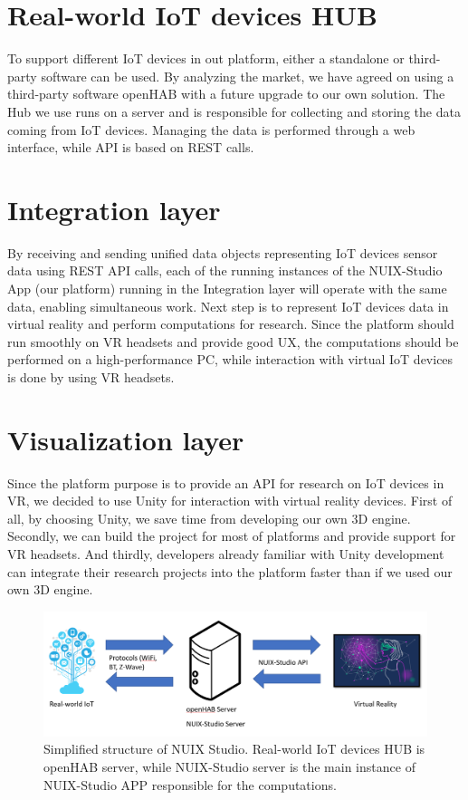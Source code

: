 \section{Real-world IoT devices HUB}
To support different IoT devices in out platform, either a standalone or third-party software can be used. By analyzing the market, we have agreed on using a third-party software openHAB with a future upgrade to our own solution. The Hub we use runs on a server and is responsible for collecting and storing the data coming from IoT devices. Managing the data is performed through a web interface, while API is based on REST calls.

\section{Integration layer}
By receiving and sending unified data objects representing IoT devices sensor data using REST API calls, each of the running instances of the NUIX-Studio App (our platform) running in the Integration layer will operate with the same data, enabling simultaneous work.
Next step is to represent IoT devices data in virtual reality and perform computations for research. Since the platform should run smoothly on VR headsets and provide good UX, the computations should be performed on a high-performance PC, while interaction with virtual IoT devices is done by using VR headsets. 

\section{Visualization layer}
Since the platform purpose is to provide an API for research on IoT devices in VR, we decided to use Unity for interaction with virtual reality devices. First of all, by choosing Unity, we save time from developing our own 3D engine. Secondly, we can build the project for most of platforms and provide support for VR headsets. And thirdly, developers already familiar with Unity development can integrate their research projects into the platform faster than if we used our own 3D engine.

\begin{figure}
  \centering
  \includegraphics[width=0.6\linewidth]{figures/BasicPlatformStructure.png}
  \caption{Simplified structure of NUIX Studio. Real-world IoT devices HUB is openHAB server, while NUIX-Studio server is the main instance of NUIX-Studio APP responsible for the computations.}
  \label{fig:BasicPlatformStructure-figure}
\end{figure}


